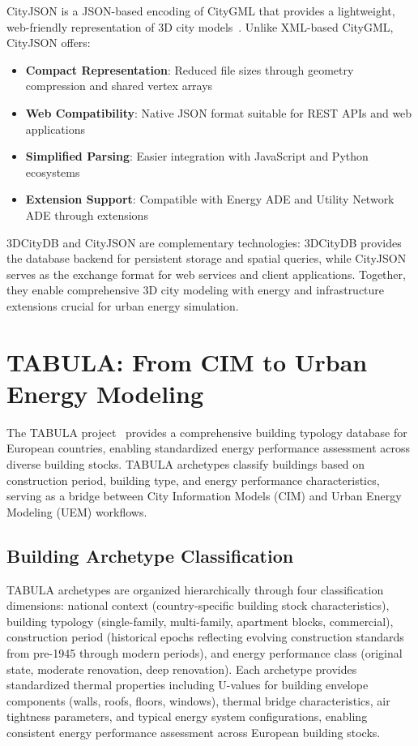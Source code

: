 CityJSON is a JSON-based encoding of CityGML that provides a lightweight, web-friendly representation of 3D city models~\cite{cityjson}. Unlike XML-based CityGML, CityJSON offers:

\begin{itemize}[leftmargin=1.2em]
  \item \textbf{Compact Representation}: Reduced file sizes through geometry compression and shared vertex arrays
  \item \textbf{Web Compatibility}: Native JSON format suitable for REST APIs and web applications
  \item \textbf{Simplified Parsing}: Easier integration with JavaScript and Python ecosystems
  \item \textbf{Extension Support}: Compatible with Energy ADE and Utility Network ADE through extensions
\end{itemize}

3DCityDB and CityJSON are complementary technologies: 3DCityDB provides the database backend for persistent storage and spatial queries, while CityJSON serves as the exchange format for web services and client applications. Together, they enable comprehensive 3D city modeling with energy and infrastructure extensions crucial for urban energy simulation.


\section{TABULA: From CIM to Urban Energy Modeling}

The TABULA project~\cite{tabula} provides a comprehensive building typology database for European countries, enabling standardized energy performance assessment across diverse building stocks. TABULA archetypes classify buildings based on construction period, building type, and energy performance characteristics, serving as a bridge between City Information Models (CIM) and Urban Energy Modeling (UEM) workflows.

\subsection{Building Archetype Classification}

TABULA archetypes are organized hierarchically through four classification dimensions: national context (country-specific building stock characteristics), building typology (single-family, multi-family, apartment blocks, commercial), construction period (historical epochs reflecting evolving construction standards from pre-1945 through modern periods), and energy performance class (original state, moderate renovation, deep renovation). Each archetype provides standardized thermal properties including U-values for building envelope components (walls, roofs, floors, windows), thermal bridge characteristics, air tightness parameters, and typical energy system configurations, enabling consistent energy performance assessment across European building stocks.



